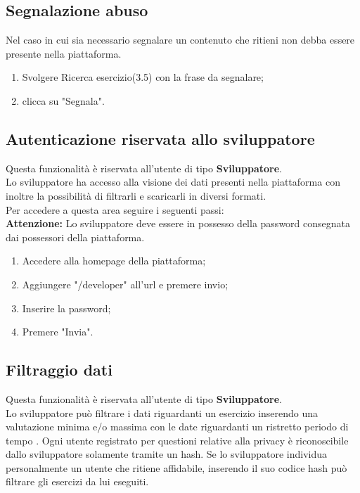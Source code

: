 \documentclass[11pt,a4paper]{article}
\begin{document}
{	\subsection{Segnalazione abuso}
	Nel caso in cui sia necessario segnalare un contenuto che ritieni non debba essere presente nella piattaforma.
	\begin{enumerate}
		\item Svolgere Ricerca esercizio(3.5) con la frase da segnalare;
		\item clicca su "Segnala".
	\end{enumerate}
	
	\subsection{Autenticazione riservata allo sviluppatore}
		Questa funzionalità è riservata all'utente di tipo \textbf{Sviluppatore}.\\
		
		Lo sviluppatore ha accesso alla visione dei dati presenti nella piattaforma con inoltre la possibilità di filtrarli e scaricarli in diversi formati.\\ Per accedere a questa area seguire i seguenti passi:\\
		
		\textbf{Attenzione:} Lo sviluppatore deve essere in possesso della password consegnata dai possessori della piattaforma.
		
		\begin{enumerate}
			\item Accedere alla homepage della piattaforma;
			\item Aggiungere "/developer" all'url e premere invio;
			\item Inserire la password;
			\item Premere "Invia".
		\end{enumerate}
	
	\subsection{Filtraggio dati}
		Questa funzionalità è riservata all'utente di tipo \textbf{Sviluppatore}.\\
		Lo sviluppatore può filtrare i dati riguardanti un esercizio inserendo una valutazione minima e/o massima con le date riguardanti un ristretto periodo di tempo . Ogni utente registrato per questioni relative alla privacy è riconoscibile dallo sviluppatore solamente tramite un hash. Se lo sviluppatore individua personalmente un utente che ritiene affidabile, inserendo il suo codice hash può filtrare gli esercizi da lui eseguiti.
		
}
\end{document}
